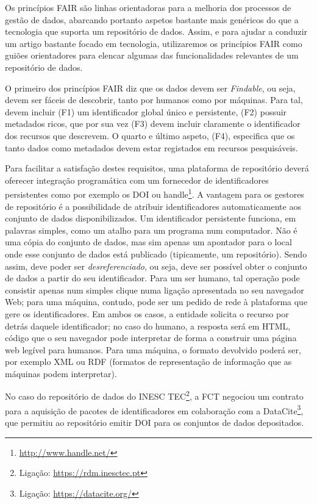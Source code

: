 \documentclass[sigconf,nonacm]{acmart}
\begin{document}
Os princípios \gls{FAIR} são linhas orientadoras para a melhoria dos processos de gestão de dados, abarcando portanto aspetos bastante mais genéricos do que a tecnologia que suporta um repositório de dados. Assim, e para ajudar a conduzir um artigo bastante focado em tecnologia, utilizaremos os princípios \gls{FAIR} como guiões orientadores para elencar algumas das funcionalidades relevantes de um repositório de dados.

O primeiro dos princípios \gls{FAIR} diz que os dados devem ser \emph{Findable}, ou seja, devem ser fáceis de descobrir, tanto por humanos como por máquinas. Para tal, devem incluir (F1) um identificador global único e persistente, (F2) possuir metadados ricos, que por sua vez (F3) devem incluir claramente o identificador dos recursos que descrevem. O quarto e último aspeto, (F4), especifica que os tanto dados como metadados devem estar registados em recursos pesquisáveis.

Para facilitar a satisfação destes requisitos, uma plataforma de repositório deverá oferecer integração programática com um fornecedor de identificadores persistentes como por exemplo os \gls{DOI} ou handle\footnote{\url{http://www.handle.net/}}. A vantagem para os gestores de repositório é a possibilidade de atribuir identificadores automaticamente aos conjunto de dados disponibilizados. Um identificador persistente funciona, em palavras simples, como um atalho para um programa num computador. Não é uma cópia do conjunto de dados, mas sim apenas um apontador para o local onde esse conjunto de dados está publicado (tipicamente, um repositório). Sendo assim, deve poder ser \emph{desreferenciado}, ou seja, deve ser possível obter o conjunto de dados a partir do seu identificador. Para um ser humano, tal operação pode consistir apenas num simples clique numa ligação apresentada no seu navegador Web; para uma máquina, contudo, pode ser um pedido de rede à plataforma que gere os identificadores. Em ambos os casos, a entidade solicita o recurso por detrás daquele identificador; no caso do humano, a resposta será em \gls{HTML}, código que o seu navegador pode interpretar de forma a construir  uma página web legível para humanos. Para uma máquina, o formato devolvido poderá ser, por exemplo \gls{XML} ou \gls{RDF} (formatos de representação de informação que as máquinas podem interpretar).

No caso do repositório de dados do INESC TEC\footnote{Ligação: \url{https://rdm.inesctec.pt}}, a \gls{FCT} negociou um contrato para a aquisição de pacotes de identificadores em colaboração com a DataCite\footnote{Ligação: \url{https://datacite.org/}}, que permitiu ao repositório emitir DOI para os conjuntos de dados depositados.
\end{document}
